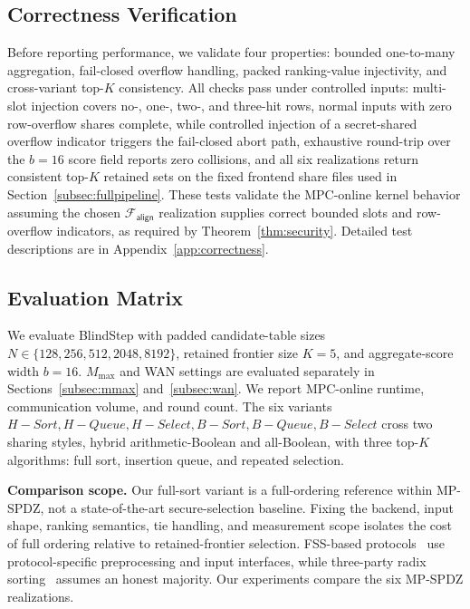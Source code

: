 \documentclass[conference,compsoc,letterpaper]{IEEEtran}
\theoremstyle{definition}
\theoremstyle{remark}
\newcommand{\BlindStep}{BlindStep\xspace}
\newcommand{\Falign}{\mathcal{F}_{\mathsf{align}}}
\newcommand{\Mmax}{M_{\max}}
\newcommand{\scorebits}{b}
\newcommand{\HSort}{H-Sort}
\newcommand{\HQueue}{H-Queue}
\newcommand{\HSelect}{H-Select}
\newcommand{\BSort}{B-Sort}
\newcommand{\BQueue}{B-Queue}
\newcommand{\BSelect}{B-Select}
\begin{document}
\subsection{Correctness Verification}
\label{subsec:correctness}

Before reporting performance, we validate four properties: bounded one-to-many aggregation, fail-closed overflow handling, packed ranking-value injectivity, and cross-variant top-$K$ consistency.
All checks pass under controlled inputs: multi-slot injection covers no-, one-, two-, and three-hit rows, normal inputs with zero row-overflow shares complete, while controlled injection of a secret-shared overflow indicator triggers the fail-closed abort path, exhaustive round-trip over the $\scorebits=16$ score field reports zero collisions, and all six realizations return consistent top-$K$ retained sets on the fixed frontend share files used in Section~\ref{subsec:fullpipeline}.
These tests validate the MPC-online kernel behavior assuming the chosen $\Falign{}$ realization supplies correct bounded slots and row-overflow indicators, as required by Theorem~\ref{thm:security}.
Detailed test descriptions are in Appendix~\ref{app:correctness}.

\subsection{Evaluation Matrix}
\label{subsec:eval_matrix}

We evaluate \BlindStep{} with padded candidate-table sizes $N \in \{128,256,512,2048,8192\}$, retained frontier size $K=5$, and aggregate-score width $\scorebits=16$.
$\Mmax$ and WAN settings are evaluated separately in Sections~\ref{subsec:mmax} and~\ref{subsec:wan}.
We report MPC-online runtime, communication volume, and round count.
The six variants $\HSort{}, \HQueue{}, \HSelect{}, \BSort{}, \BQueue{}, \BSelect{}$ cross two sharing styles, hybrid arithmetic-Boolean and all-Boolean, with three top-$K$ algorithms: full sort, insertion queue,
and repeated selection.

\smallskip
\noindent\textbf{Comparison scope.}
Our full-sort variant is a full-ordering reference within
MP-SPDZ, not a state-of-the-art secure-selection baseline.
Fixing the backend, input shape, ranking semantics,
tie handling, and measurement scope isolates the cost
of full ordering relative to retained-frontier selection.
FSS-based protocols~\cite{agarwal2024secure} use
protocol-specific preprocessing and input interfaces,
while three-party radix sorting~\cite{asharov2022efficient}
assumes an honest majority.
Our experiments compare the six MP-SPDZ realizations.
\end{document}
